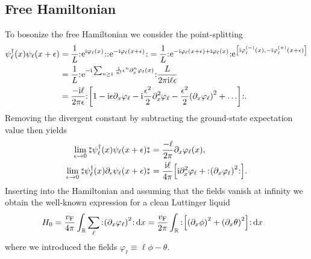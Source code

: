 \documentclass[english, parskip=full]{scrartcl}
\begin{document}
\subsection{Free Hamiltonian}
To bosonize the free Hamiltonian we consider the point-splitting
\begin{align}
\psi_\ell^\dagger(x) \psi_\ell(x+\epsilon) &= \frac{1}{L} \normord{\powe{\i\varphi_\ell(x)}} \normord{\powe{-\i\varphi_\ell(x+\epsilon)}} = \frac{1}{L} \normord{\powe{-\i\varphi_\ell(x+\epsilon) + \i\varphi_\ell(x)}} \powe{\klb*{\i\varphi_\ell^{(-)}(x), -\i\varphi_\ell^{(+)}(x+\epsilon)}} \\
&= \frac{1}{L} \normord{\powe{-\i\sum_{n\ge 1} \frac{1}{n!} \epsilon^n \partial_x^n\varphi_\ell(x)}} \frac{L}{2\pi\i\ell \epsilon} \\
&= \frac{-\i\ell}{2\pi\epsilon} \normord{\klb*{1 -\i \epsilon \partial_x\varphi_\ell - \i \frac{\epsilon^2}{2} \partial_x^2\varphi_\ell - \frac{\epsilon^2}{2} \kla*{\partial_x\varphi_\ell}^2 + \dots} }.
\end{align}
Removing the divergent constant by subtracting the ground-state expectation value then yields
\begin{align}
\lim_{\epsilon\rightarrow 0} \varnormord{\psi_\ell^\dagger(x) \psi_\ell(x+\epsilon)} &= \frac{-\ell}{2\pi} \partial_x\varphi_\ell(x),\\
\lim_{\epsilon\rightarrow 0} \varnormord{\psi_\ell^\dagger(x)\partial_\epsilon \psi_\ell(x+\epsilon)} &= \frac{\i\ell}{4\pi} \klb*{\i \partial_x^2\varphi_\ell + \normord{\kla*{\partial_x\varphi_\ell}^2} }.
\end{align}
Inserting into the Hamiltonian and assuming that the fields vanish at infinity we obtain the well-known expression for a clean Luttinger liquid
\begin{align}
H_0 &= \frac{\vf}{4\pi} \intr{\sum_\ell \normord{ \kla*{\partial_x\varphi_\ell}^2 }}{x} = \frac{\vf}{2\pi} \intr{ \normord{ \klb*{\kla*{\partial_x\phi}^2 + \kla*{\partial_x\theta}^2} }}{x}
\end{align}
where we introduced the fields $\varphi_\ell\equiv \ell\phi - \theta$.
\end{document}
